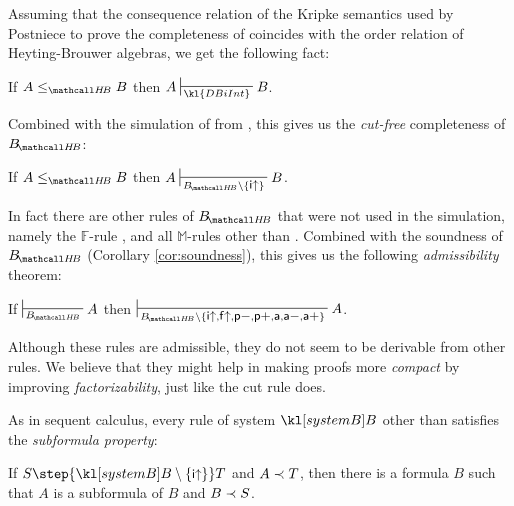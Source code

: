 Assuming that the consequence relation of the Kripke semantics used by Postniece
to prove the completeness of  coincides with the order relation of
Heyting-Brouwer algebras, we get the following fact:

\begin{fact}
  If $A \sementHB B$ then $A \prov{\kl{DBiInt}} B$.
\end{fact}

Combined with the simulation of  from ,
this gives us the \emph{cut-free} completeness of $\sysBHB$:

\begin{theorem}
  If $A \sementHB B$ then $A \prov{\sysBHB \setminus \{\rsf{i{\ua}}\}} B$.
\end{theorem}

In fact there are other rules of $\sysBHB$ that were not used in the simulation,
namely the $\mathbb{F}$-rule , and all $\mathbb{M}$-rules other
than . Combined with the soundness of $\sysBHB$ (Corollary
\ref{cor:soundness}), this gives us the following \emph{admissibility} theorem:

\begin{theorem}[Admissibility]

  If $\prov{\sysBHB} A$ then $\prov{\sysBHB \setminus
  \{\rsf{i{\ua}},\rsf{f{\ua}},\rsf{p{-}},\rsf{p{+}},\rsf{a},\rsf{a{-}},\rsf{a{+}}\}}
  A$.
\end{theorem}

Although these rules are admissible, they do not seem to be derivable from other
rules. We believe that they might help in making proofs more \emph{compact} by
improving \emph{factorizability}, just like the cut rule does.

As in sequent calculus, every rule of system $\sysB$ other than
 satisfies the \emph{subformula property}:

\begin{fact}\label{cor:subformula-property} If $S
  \step{\sysB \setminus \{\rsf{i{\ua}}\}} T$ and $A \prec T$, then there is a
  formula $B$ such that $A$ is a subformula of $B$ and $B \prec S$.
\end{fact}


